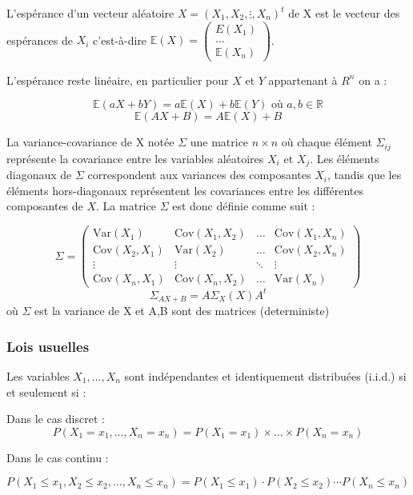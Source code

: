 \documentclass[
  letterpaper,
  DIV=11,
  numbers=noendperiod]{scrartcl}
\begin{document}
L'espérance d'un vecteur aléatoire \(X = (X_1, X_2, \vdots, X_n)^t\) de
X est le vecteur des espérances de \(X_i\) c'est-à-dire
\(\mathbb{E}(X) = \left(\begin{array}{c} E(X_1) \\ \ldots \\ \mathbb{E}(X_n) \end{array} \right)\).

L'espérance reste linéaire, en particulier pour \(X\) et \(Y\)
appartenant à \(R^n\) on a :

\[\mathbb{E}(aX + bY) = a\mathbb{E}(X) + b\mathbb{E}(Y) \text{ où } a,b \in \mathbb{R}\]
\[\mathbb{E}(AX + B) = A\mathbb{E}(X)+B\]

La variance-covariance de X notée \(\Sigma\) une matrice \(n \times n\)
où chaque élément \(\Sigma_{ij}\) représente la covariance entre les
variables aléatoires \(X_i\) et \(X_j\). Les éléments diagonaux de
\(\Sigma\) correspondent aux variances des composantes \(X_i\), tandis
que les éléments hors-diagonaux représentent les covariances entre les
différentes composantes de \(X\). La matrice \(\Sigma\) est donc définie
comme suit :

\[
\Sigma = \begin{pmatrix}
\text{Var}(X_1) & \text{Cov}(X_1, X_2) & \dots & \text{Cov}(X_1, X_n) \\
\text{Cov}(X_2, X_1) & \text{Var}(X_2) & \dots & \text{Cov}(X_2, X_n) \\
\vdots & \vdots & \ddots & \vdots \\
\text{Cov}(X_n, X_1) & \text{Cov}(X_n, X_2) & \dots & \text{Var}(X_n)
\end{pmatrix}
\] \[ \Sigma_{AX + B} = A\Sigma_X(X)A^t\] où \(\Sigma\) est la variance
de X et A,B sont des matrices (deterministe)

\subsubsection{Lois usuelles}\label{lois-usuelles}

\begin{tcolorbox}[enhanced jigsaw, opacityback=0, toptitle=1mm, bottomtitle=1mm, rightrule=.15mm, colframe=quarto-callout-tip-color-frame, leftrule=.75mm, titlerule=0mm, breakable, bottomrule=.15mm, colbacktitle=quarto-callout-tip-color!10!white, coltitle=black, arc=.35mm, left=2mm, colback=white, toprule=.15mm, title=\textcolor{quarto-callout-tip-color}{\faLightbulb}\hspace{0.5em}{Tip}, opacitybacktitle=0.6]

Les variables \(X_1, \ldots, X_n\) sont indépendantes et identiquement
distribuées (i.i.d.) si et seulement si :

Dans le cas discret :
\[P(X_1 = x_1, \ldots, X_n = x_n) = P(X_1 = x_1) \times \ldots \times P(X_n = x_n)\]

Dans le cas continu :

\[P(X_1 \leq x_1, X_2 \leq x_2, \ldots, X_n \leq x_n) = P(X_1 \leq x_1) \cdot P(X_2 \leq x_2) \cdots P(X_n \leq x_n)\]

\end{tcolorbox}
\end{document}
